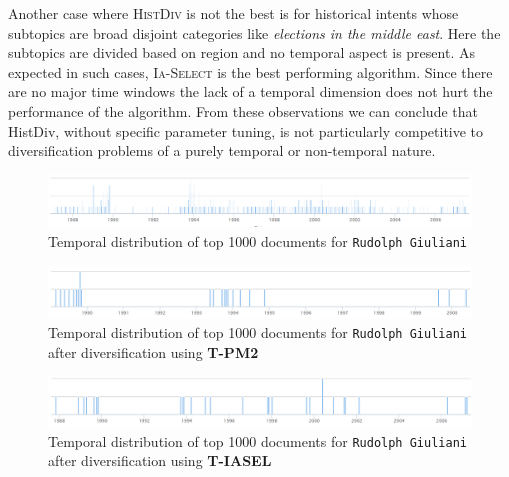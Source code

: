 Another case where \textsc{HistDiv} is not the best is for historical intents whose subtopics are broad disjoint categories like \emph{elections in the middle east}. Here the subtopics are divided based on region and no temporal aspect is present. As expected in such cases, \textsc{Ia-Select} is the best performing algorithm. Since there are no major time windows the lack of a temporal dimension does not hurt the performance of the algorithm. From these observations we can conclude that HistDiv, without specific parameter tuning, is not particularly competitive to diversification problems of a purely temporal or non-temporal nature. 




\begin{figure}[!h]
\centering
\includegraphics[width=\textwidth]{images/rg_timeline.png}
    \caption{Temporal distribution of top 1000 documents for \texttt{Rudolph Giuliani}}
    \label{fig:temporal_rg}
\end{figure}

\begin{figure}[!h]
\centering
 \includegraphics[width=\textwidth]{images/rg_timeline_pm230.png}
    \caption{Temporal distribution of top 1000 documents for \texttt{Rudolph Giuliani} after diversification using \textbf{T-PM2}}
    \label{fig:temporal_rg}
\end{figure}

\begin{figure}[!h]
\centering
\includegraphics[width=\textwidth]{images/rg_timeline_iasel30.png}
    \caption{Temporal distribution of top 1000 documents for \texttt{Rudolph Giuliani} after diversification using \textbf{T-IASEL}}
    \label{fig:temporal_rg}
\end{figure}

